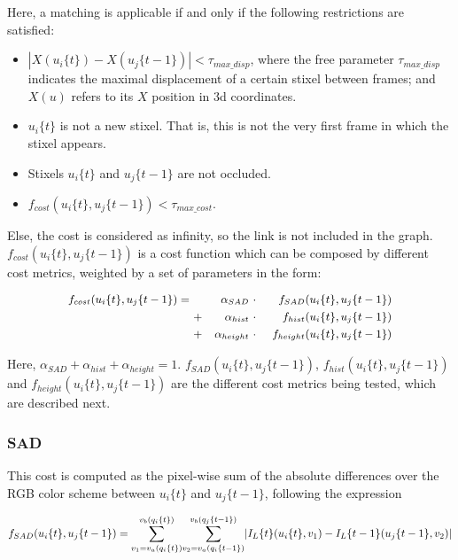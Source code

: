 Here, a matching is applicable if and only if the following restrictions are satisfied:
\begin{itemize}
 \item $|X(u_i\{t\}) - X(u_j\{t - 1\})| < \tau_{max\_disp}$, where the free parameter $\tau_{max\_disp}$ indicates the maximal displacement of a certain stixel between frames; and $X(u)$ refers to its $X$ position in 3d coordinates.
 \item $u_i\{t\}$ is not a new stixel. That is, this is not the very first frame in which the stixel appears.
 \item Stixels $u_i\{t\}$ and $u_j\{t - 1\}$ are not occluded.
 \item $f_{cost}(u_i\{t\}, u_j\{t - 1\}) < \tau_{max\_cost}$.
\end{itemize}

Else, the cost is considered as infinity, so the link is not included in the graph. $f_{cost}(u_i\{t\}, u_j\{t - 1\})$ is a cost function which can be composed by different cost metrics, weighted by a set of parameters in the form:

\begin{equation}\label{eq:cp04_cost_function}
\small
  \begin{align*}
  f_{cost}(u_i\{t\}, u_j\{t - 1\}) =~  & & \alpha_{SAD} & ~\cdot~ & f_{SAD}(u_i\{t\}, u_j\{t - 1\}) \\
      & + & \alpha_{hist} & ~\cdot~ & f_{hist}(u_i\{t\}, u_j\{t - 1\}) \\
      & + & \alpha_{height} & ~\cdot~ & f_{height}(u_i\{t\}, u_j\{t - 1\})
  \end{align*}
\end{equation}

Here, $\alpha_{SAD} + \alpha_{hist} + \alpha_{height} = 1$. $f_{SAD}(u_i\{t\}, u_j\{t - 1\})$, $f_{hist}(u_i\{t\}, u_j\{t - 1\})$ and $f_{height}(u_i\{t\}, u_j\{t - 1\})$ are the different cost metrics being tested, which are described next.

\subsubsection{\acf{SAD}}\label{ch:chapter04_01_03_01_01}

This cost is computed as the pixel-wise sum of the absolute differences over the RGB color scheme between $u_i\{t\}$ and $u_j\{t - 1\}$, following the expression

\begin{equation}\label{eq:cp04_stixel_movement_sad_cost}
\tiny
f_{SAD}(u_i\{t\}, u_j\{t - 1\}) = 
\overset{v_b(q_i\{t\})}{\underset{v_1=v_a(q_i\{t\})}{\sum}}
\overset{v_b(q_j\{t - 1\})}{\underset{v_2=v_a(q_i\{t - 1\})}{\sum}}
| I_L\{t\}(u_i\{t\}, v_1) - I_L\{t - 1\}(u_j\{t - 1\}, v_2) |
\end{equation}

